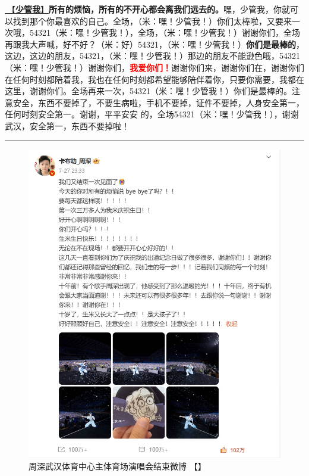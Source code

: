 \documentclass[]{ctexbook}
\begin{document}
\hyperref[watch-ur-manners]{🎵【\textbf{少管我}】}\textbf{所有的烦恼，所有的不开心都会离我们远去的。}嘿，少管我，你就可以找到那个你最喜欢的自己。全场，（米：嘿！少管我！）你们太棒啦，又要来一次哦，54321（米：嘿！少管我！），全场，（米：嘿！少管我！）谢谢你们，全场再跟我大声喊，好不好？（米：好）54321，（米：嘿！少管我！）\textbf{你们是最棒的}，这边，这边的朋友，54321，（米：嘿！少管我！）那边的朋友不能逊色哦，54321（米：嘿！少管我！）谢谢你们，\textbf{\textcolor{red}{我爱你们！}}谢谢你们来，谢谢你们在，谢谢你们在任何时刻都陪着我，我也在任何时刻都希望能够陪伴着你，只要你需要，我都在这里，谢谢你们。全场再来一次，54321（米：嘿！少管我！）你们是最棒的。注意安全，东西不要掉了，不要生病啦，手机不要掉，证件不要掉，人身安全第一，任何时刻安全第一。谢谢，平平安安 的，全场54321（米：嘿！少管我！），谢谢武汉，安全第一，东西不要掉啦！

\begin{center}\rule{0.5\linewidth}{0.5pt}\end{center}

\begin{figure}
\centering
\includegraphics{img/weibo/wuhan-20240727.png}
\caption{\label{fig:unnamed-chunk-67}周深武汉体育中心主体育场演唱会结束微博 【\citet{weibo-charlie}】}
\end{figure}
\end{document}
